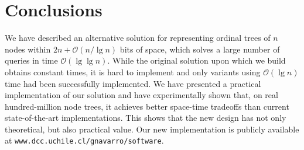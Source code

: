 \documentclass[11pt]{article}
\renewcommand{\log}{\lg}
\newcommand{\0}{\mathit{0}}
\newcommand{\1}{\mathit{1}}
\newcommand{\Oh}[1]{\mathcal{O}\!\left(#1\right)}
\begin{document}
\section{Conclusions}

We have described an alternative solution for representing ordinal trees of $n$
nodes within $2n+\Oh{n/\log n}$ bits of space, which solves a large number of
queries in time $\Oh{\log\log n}$. While the original solution upon which we
build \cite{NS14} obtains constant times, it is hard to implement and only
variants using $\Oh{\log n}$ time had been successfully implemented.  We have
presented a practical implementation of our solution and have experimentally
shown that, on real hundred-million node trees, it achieves better space-time
tradeoffs than current state-of-the-art implementations. This shows that the
new design has not only theoretical, but also practical value. Our new
implementation is publicly available at 
{\tt www.dcc.uchile.cl/gnavarro/software}.









\end{document}

